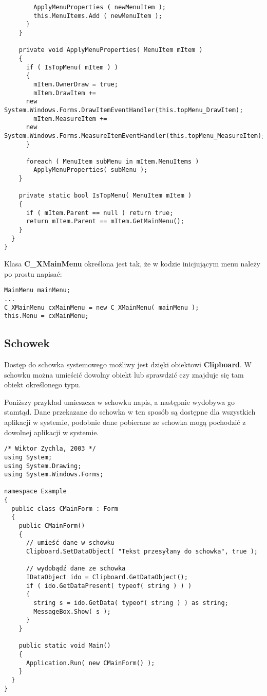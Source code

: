 \begin{scriptsize}
\begin{verbatim}
        ApplyMenuProperties ( newMenuItem );
        this.MenuItems.Add ( newMenuItem );
      }			
    }
		
    private void ApplyMenuProperties( MenuItem mItem )
    {
      if ( IsTopMenu( mItem ) )
      {
        mItem.OwnerDraw = true;
        mItem.DrawItem += 
	  new System.Windows.Forms.DrawItemEventHandler(this.topMenu_DrawItem);
        mItem.MeasureItem += 
	  new System.Windows.Forms.MeasureItemEventHandler(this.topMenu_MeasureItem);				
      }

      foreach ( MenuItem subMenu in mItem.MenuItems )
        ApplyMenuProperties( subMenu );
    }

    private static bool IsTopMenu( MenuItem mItem )
    {
      if ( mItem.Parent == null ) return true;
      return mItem.Parent == mItem.GetMainMenu();
    }
  }
}
\end{verbatim}
\end{scriptsize}

Klasa {\bf C\_XMainMenu} określona jest tak, że w kodzie inicjującym menu należy po prostu napisać:

\begin{scriptsize}
\begin{verbatim}
MainMenu mainMenu;
...
C_XMainMenu cxMainMenu = new C_XMainMenu( mainMenu );
this.Menu = cxMainMenu; 
\end{verbatim}
\end{scriptsize}

\subsection{Schowek}

Dostęp do schowka systemowego możliwy jest dzięki obiektowi {\bf Clipboard}. W schowku można
umieścić dowolny obiekt lub sprawdzić czy znajduje się tam obiekt określonego typu.

Poniższy przykład umieszcza w schowku napis, a następnie wydobywa go stamtąd. Dane przekazane
do schowka w ten sposób są dostępne dla wszystkich aplikacji w systemie, podobnie dane
pobierane ze schowka mogą pochodzić z dowolnej aplikacji w systemie.

\begin{scriptsize}
\begin{verbatim}
/* Wiktor Zychla, 2003 */
using System;
using System.Drawing;
using System.Windows.Forms;

namespace Example
{
  public class CMainForm : Form
  {  
    public CMainForm() 
    {
      // umieść dane w schowku
      Clipboard.SetDataObject( "Tekst przesyłany do schowka", true );

      // wydobądź dane ze schowka
      IDataObject ido = Clipboard.GetDataObject();
      if ( ido.GetDataPresent( typeof( string ) ) )
      {
        string s = ido.GetData( typeof( string ) ) as string;
        MessageBox.Show( s );
      }
    }

    public static void Main()
    {    
      Application.Run( new CMainForm() );
    }
  }
}
\end{verbatim}
\end{scriptsize}

